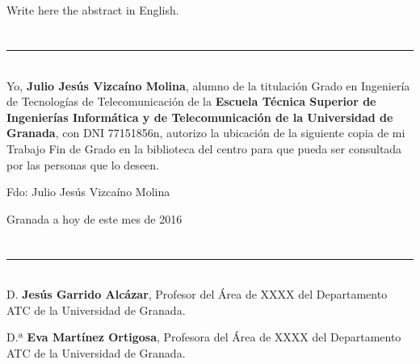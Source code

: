 \\

\vspace{0.7cm}
\\

Write here the abstract in English.

\chapter*{}
\thispagestyle{empty}

\noindent\rule[-1ex]{\textwidth}{2pt}\\[4.5ex]

Yo, \textbf{Julio Jesús Vizcaíno Molina}, alumno de la titulación Grado en Ingeniería de Tecnologías de Telecomunicación de la \textbf{Escuela Técnica Superior de Ingenierías Informática y de Telecomunicación de la Universidad de Granada}, con DNI 77151856n, autorizo la ubicación de la siguiente copia de mi Trabajo Fin de Grado en la biblioteca del centro para que pueda ser consultada por las personas que lo deseen.

\vspace{6cm}

\noindent Fdo: Julio Jesús Vizcaíno Molina

\vspace{2cm}

\begin{flushright}
Granada a hoy de este mes de 2016
\end{flushright}


\chapter*{}
\thispagestyle{empty}

\noindent\rule[-1ex]{\textwidth}{2pt}\\[4.5ex]

D. \textbf{Jesús Garrido Alcázar}, Profesor del Área de XXXX del Departamento ATC de la Universidad de Granada.

\vspace{0.5cm}

D.ª \textbf{Eva Martínez Ortigosa}, Profesora del Área de XXXX del Departamento ATC de la Universidad de Granada.


\vspace{0.5cm}

